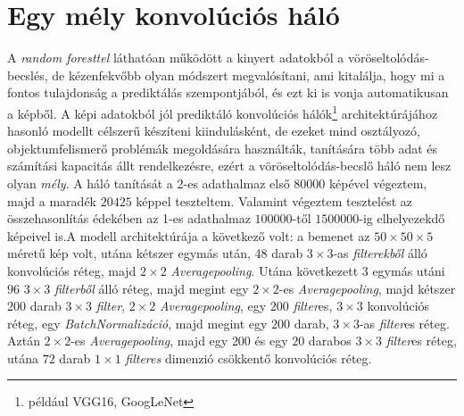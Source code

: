 \documentclass[12pt,letterpaper,twoside,openright]{book}
\begin{document}
 
 \section{Egy mély konvolúciós háló}
 A \textit{random foresttel} láthatóan működött a kinyert adatokból a vöröseltolódás-becslés, de kézenfekvőbb olyan módszert megvalósítani, ami kitalálja, hogy mi a fontos tulajdonság a prediktálás szempontjából, és ezt ki is vonja automatikusan a képből.  
 \newline\indent
 A képi adatokból jól prediktáló konvolúciós hálók\footnote{például VGG16, GoogLeNet} architektúrájához hasonló modellt célszerű készíteni kiindulásként, de ezeket mind osztályozó, objektumfelismerő problémák megoldására használták, tanítására több adat és számítási kapacitás állt rendelkezésre, ezért a vöröseltolódás-becslő háló nem lesz olyan \textit{mély}. A háló tanítását a 2-es adathalmaz első $\num{80000}$ képével végeztem, majd a maradék $\num{20425}$ képpel teszteltem. Valamint végeztem tesztelést az összehasonlítás édekében az 1-es adathalmaz $\num{100000}$-től $1500000$-ig elhelyezekdő képeivel is.\newline\indent A modell architektúrája a következő volt: a bemenet az $50\times50\times5$ méretű kép volt, utána kétszer egymás után, 48 darab $3\times 3$-as \textit{filterekből} álló konvolúciós réteg, majd $2\times 2$ \textit{Averagepooling}. Utána következett 3 egymás utáni $96$ $3\times3$ \textit{filterből} álló réteg, majd megint egy $2\times2$-es \textit{Averagepooling}, majd kétszer $200$ darab $3\times3$ \textit{filter}, $2\times 2$ \textit{Averagepooling}, egy $200$ \textit{filter}es, $3\times 3$ konvolúciós réteg, egy \textit{BatchNormalizáció}, majd megint egy $200$ darab, $3\times 3$-as \textit{filter}es réteg. Aztán $2\times 2$-es \textit{Averagepooling}, majd egy $200$ és egy $20$ darabos $3\times 3$ \textit{filter}es réteg, utána $72$ darab $1\times 1$ \textit{filteres} dimenzió csökkentő konvolúciós réteg.
\end{document}
